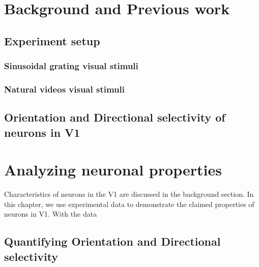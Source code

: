\documentclass[MTech]{iitmdiss}
\begin{document}

\chapter{Background and Previous work}
\label{chap:lit}
\section{Experiment setup} %
\label{sec:experiment_setup}
\subsection{Sinusoidal grating visual stimuli} %
\label{sub:sinusoidal_grating_visual_stimuli}


\subsection{Natural videos visual stimuli} %
\label{sub:natural_videos_visual_stimuli}


\section{Orientation and Directional selectivity of neurons in V1} %
\label{sec:orientation_and_directional_selectivity_of_neurons_in_v1}


\chapter{Analyzing neuronal properties}
\label{chap:searchmotif}
Characteristics of neurons in the V1 are discussed in the background section. In this chapter, we use experimental data to demonstrate the claimed properties of neurons in V1. With the data 
\section{Quantifying Orientation and Directional selectivity} %
\label{sec:quantifying_orientation_and_directional_selectivity}
\end{document}
